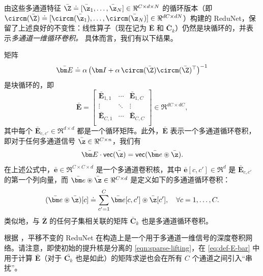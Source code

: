 \documentclass[../../book-main_zh.tex]{subfiles}
\begin{document}
由这些多通道特征 $\bar\Z \doteq [\bar \z_1, \ldots, \bar \z_N] \in \Re^{C \times d \times N}$ 的循环版本（即 $\circm(\bar\Z) \doteq [ \circm(\bar\z_1), \dots, \circm(\bar\z_N)] \in \Re^{dC \times dN}$）构建的 ReduNet，保留了上述良好的不变性：线性算子（现在记为 $\bar{\bm E}$ 和 $\bar{\bm C}_k$）仍然是块循环的，并表示{\em 多通道一维循环卷积。} 具体而言，我们有以下结果。
\begin{proposition}
    矩阵
    \begin{equation}
        \label{eq:def-E-bar}
        \bar{\bm E} \doteq \alpha\left(\bm I + \alpha\,
        \circm(\bar\Z) \circm(\bar\Z)^\top \right) ^{-1}
    \end{equation}
    是块循环的，即
    \begin{equation*}
        \bar{\bm E} =
        \left[
            \begin{matrix}
                \bar{\bm E}_{1, 1} & \cdots & \bar{\bm E}_{1, C}\\
                \vdots & \ddots & \vdots \\
                \bar{\bm E}_{C, 1} & \cdots & \bar{\bm E}_{C, C}\\
        \end{matrix}\right] \in \Re^{dC \times dC},
    \end{equation*}
    其中每个 $\bar{\bm E}_{c, c'}\in \Re^{d \times d}$ 都是一个循环矩阵。此外，$\bar{\bm E}$ 表示一个多通道循环卷积，即对于任何多通道信号 $\bar\z \in \Re^{C \times n}$，我们有
    $$\bar{\bm E} \cdot \textsf{vec}(\bar\z) = \textsf{vec}( \bar{\bm
    e} \circledast \bar\z).$$
    在上述公式中，$\bar{\bm e} \in \Re^{C \times C \times d}$ 是一个多通道卷积核，其中 $\bar{\bm e}[c, c'] \in \Re^{d}$ 是 $\bar{\bm E}_{c, c'}$ 的第一个列向量，而 $\bar{\bm e} \circledast \bar\z \in \Re^{C \times d}$ 是定义如下的多通道循环卷积：
    \begin{equation*}
        (\bar{\bm e} \circledast \bar\z)[c] \doteq \sum_{c'=1}^C
        \bar{\bm e}[c, c'] \circledast \bar{\z}[c'], \quad \forall c
        = 1, \ldots, C.
    \end{equation*}
    类似地，与 $\bar{\bm Z}$ 的任何子集相关联的矩阵 $\bar{\bm C}_k$ 也是多通道循环卷积。
    \label{prop:multichannel-circular-conv-1}
\end{proposition}
根据 ，平移不变的 ReduNet 在构造上是一个用于多通道一维信号的深度卷积网络。请注意，即使初始的提升核是分离的 \eqref{eqn:sparse-lifting}，在 \eqref{eq:def-E-bar} 中用于计算 $\bar{\bm E}$（对于 $\bar{\bm C_k}$ 也是如此）的矩阵求逆也会在所有 $C$ 个通道之间引入“串扰”。 %
\end{document}
